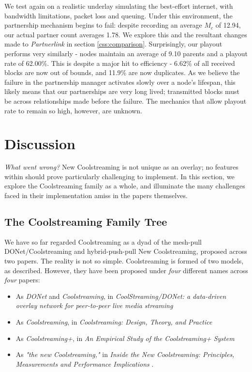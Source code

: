 \documentclass[12pt,a4paper]{article}
\begin{document}
We test again on a realistic underlay simulating the best-effort internet, with bandwidth limitations, packet loss and queuing. Under this environment, the partnership mechanism begins to fail: despite recording an average \(M_c\) of 12.94, our actual partner count averages 1.78. We explore this and the resultant changes made to \textit{Partnerlink} in section \ref{css:comparison}. Surprisingly, our playout performs very similarly - nodes maintain an average of 9.10 parents and a playout rate of 62.00\%. This is despite a major hit to efficiency - 6.62\% of all received blocks are now out of  bounds, and 11.9\% are now duplicates. As we believe the failure in the partnership manager activates slowly over a node's lifespan, this likely means that our partnerships are very long lived; transmitted blocks must be across relationships made before the failure. The mechanics that allow playout rate to remain so high, however, are unknown.

\section{Discussion} \label{problems}
\textit{What went wrong?} New Coolstreaming is not unique as an overlay; no features within should prove particularly challenging to implement. In this section, we explore the Coolstreaming family as a whole, and illuminate the many challenges faced in their implementation amiss in the papers themselves.

\subsection{The Coolstreaming Family Tree} \label{problems:familytree}
We have so far regarded Coolstreaming as a dyad of the mesh-pull DONet/Coolstreaming and hybrid-push-pull New Coolstreaming, proposed across two papers. The reality is not so simple. Coolstreaming is formed of two models, as described. However, they have been proposed under \textit{four} different names across \textit{four} papers:

\begin{itemize}
	\item As \textit{DONet} and \textit{Coolstreaming}, in \textit{CoolStreaming/DONet: a data-driven overlay network for peer-to-peer live media streaming} \cite{Zhang2005}
	\item As \textit{Coolstreaming}, in \textit{Coolstreaming: Design, Theory, and Practice} \cite{Xie2007}
	\item As \textit{Coolstreaming+}, in \textit{An Empirical Study of the Coolstreaming+ System} \cite{Li2007}
	\item As \textit{"the new Coolstreaming,"} in \textit{Inside the New Coolstreaming: Principles, Measurements and Performance Implications} \cite{Li2008}.
\end{itemize}
\end{document}
